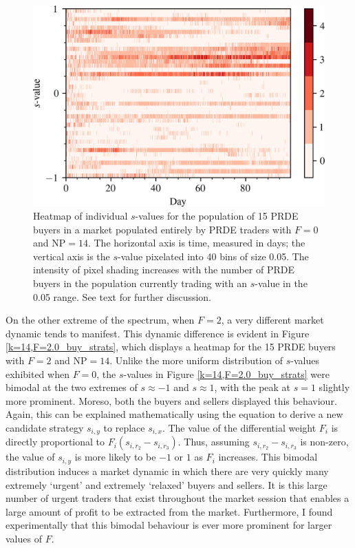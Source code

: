 \documentclass[a4paper,twoside]{article}
\begin{document}
\begin{figure}[htbp]
    \centerline{\includegraphics[width=\columnwidth]{k=14,F=0.0_buy_strats.png}}
    \caption{
        Heatmap of individual $s$-values for the population of 15 PRDE buyers in a market populated entirely by PRDE traders with $F=0$ and $\mathrm{NP}=14$.
        The horizontal axis is time, measured in days; the vertical axis is the $s$-value pixelated into 40 bins of size 0.05.
        The intensity of pixel shading increases with the number of PRDE buyers in the population currently trading with an $s$-value in the 0.05 range.
        See text for further discussion.
    }
    \label{k=14,F=0.0_buy_strats}
\end{figure}

On the other extreme of the spectrum, when $F=2$, a very different market dynamic tends to manifest.
This dynamic difference is evident in Figure \ref{k=14,F=2.0_buy_strats}, which displays a heatmap for the 15 PRDE buyers with $F=2$ and $\mathrm{NP}=14$.
Unlike the more uniform distribution of $s$-values exhibited when $F=0$, the $s$-values in Figure \ref{k=14,F=2.0_buy_strats} were bimodal at the two extremes of $s\approx-1$ and $s\approx1$, with the peak at $s=1$ slightly more prominent.
Moreso, both the buyers and sellers displayed this behaviour.
Again, this can be explained mathematically using the equation to derive a new candidate strategy $s_{i,y}$ to replace $s_{i,x}$.
The value of the differential weight $F_i$ is directly proportional to $F_i(s_{i,r_2}-s_{i,r_3})$.
Thus, assuming $s_{i,r_2}-s_{i,r_3}$ is non-zero, the value of $s_{i,y}$ is more likely to be $-1$ or $1$ as $F_i$ increases.
This bimodal distribution induces a market dynamic in which there are very quickly many extremely `urgent' and extremely `relaxed' buyers and sellers.
It is this large number of urgent traders that exist throughout the market session that enables a large amount of profit to be extracted from the market.
Furthermore, I found experimentally that this bimodal behaviour is ever more prominent for larger values of $F$.
\end{document}
